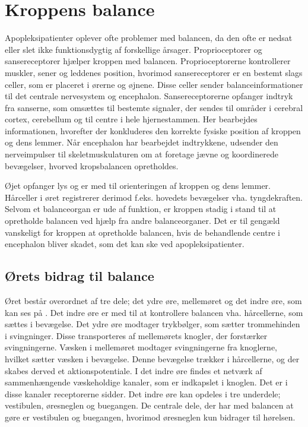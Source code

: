 \chapter{Kroppens balance}\label{app-Balance}
Apopleksipatienter oplever ofte problemer med balancen, da den ofte er nedsat eller slet ikke funktionsdygtig af forskellige årsager. \cite{Karnath2003} Proprioceptorer og sansereceptorer hjælper kroppen med balancen. Proprioceptorerne kontrollerer muskler, sener og leddenes position, hvorimod sansereceptorer er en bestemt slags celler, som er placeret i ørerne og øjnene. \cite{Martini2012} Disse celler sender balanceinformationer til det centrale nervesystem og encephalon. Sansereceptorerne opfanger indtryk fra sanserne, som omsættes til bestemte signaler, der sendes til områder i cerebral cortex, cerebellum og til centre i hele hjernestammen. Her bearbejdes informationen, hvorefter der konkluderes den korrekte fysiske position af kroppen og dens lemmer. Når encephalon har bearbejdet indtrykkene, udsender den nerveimpulser til skeletmuskulaturen om at foretage jævne og koordinerede bevægelser, hvorved kropsbalancen opretholdes.\cite{Martini2012}

Øjet opfanger lys og er med til orienteringen af kroppen og dens lemmer. Hårceller i øret registrerer derimod f.eks. hovedets bevægelser vha. tyngdekraften. Selvom et balanceorgan er ude af funktion, er kroppen stadig i stand til at opretholde balancen ved hjælp fra andre balanceorganer. Det er til gengæld vanskeligt for kroppen at opretholde balancen, hvis de behandlende centre i encephalon bliver skadet, som det kan ske ved apopleksipatienter. \cite{Martini2012} \\

\section{Ørets bidrag til balance}
Øret består overordnet af tre dele; det ydre øre, mellemøret og det indre øre, som kan ses på . Det indre øre er med til at kontrollere balancen vha. hårcellerne, som sættes i bevægelse. Det ydre øre modtager trykbølger, som sætter trommehinden i svingninger. Disse transporteres af mellemørets knogler, der forstærker svingningerne. Væsken i mellemøret modtager svingningerne fra knoglerne, hvilket sætter væsken i bevægelse. Denne bevægelse trækker i hårcellerne, og der skabes derved et aktionspotentiale. I det indre øre findes et netværk af sammenhængende væskeholdige kanaler, som er indkapslet i knoglen. Det er i disse kanaler receptorerne sidder. Det indre øre kan opdeles i tre underdele; vestibulen, øresneglen og buegangen. De centrale dele, der har med balancen at gøre er vestibulen og buegangen, hvorimod øresneglen kun bidrager til hørelsen.\cite{Martini2012}

